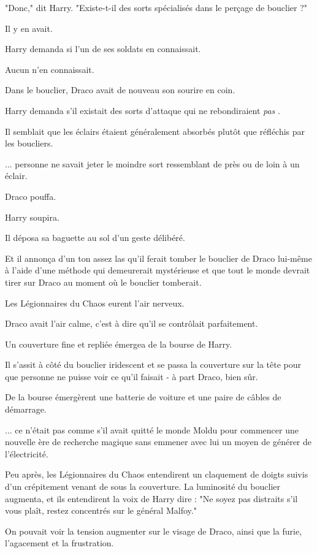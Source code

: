 "Donc," dit Harry. "Existe-t-il des sorts spécialisés dans le perçage de bouclier ?"

Il y en avait.

Harry demanda si l'un de ses soldats en connaissait.

Aucun n'en connaissait.

Dans le bouclier, Draco avait de nouveau son sourire en coin.

Harry demanda s'il existait des sorts d'attaque qui ne rebondiraient \emph{pas} .

Il semblait que les éclairs étaient généralement absorbés plutôt que réfléchis par les boucliers.

... personne ne savait jeter le moindre sort ressemblant de près ou de loin à un éclair.

Draco pouffa.

Harry soupira.

Il déposa sa baguette au sol d'un geste délibéré.

Et il annonça d'un ton assez las qu'il ferait tomber le bouclier de Draco lui-même à l'aide d'une méthode qui demeurerait mystérieuse et que tout le monde devrait tirer sur Draco au moment où le bouclier tomberait.

Les Légionnaires du Chaos eurent l'air nerveux.

Draco avait l'air calme, c'est à dire qu'il se contrôlait parfaitement.

Un couverture fine et repliée émergea de la bourse de Harry.

Il s'assit à côté du bouclier iridescent et se passa la couverture sur la tête pour que personne ne puisse voir ce qu'il faisait - à part Draco, bien sûr.

De la bourse émergèrent une batterie de voiture et une paire de câbles de démarrage.

... ce n'était pas comme s'il avait quitté le monde Moldu pour commencer une nouvelle ère de recherche magique sans emmener avec lui un moyen de générer de l'électricité.

Peu après, les Légionnaires du Chaos entendirent un claquement de doigts suivis d'un crépitement venant de sous la couverture. La luminosité du bouclier augmenta, et ils entendirent la voix de Harry dire : "Ne soyez pas distraits s'il vous plaît, restez concentrés sur le général Malfoy."

On pouvait voir la tension augmenter sur le visage de Draco, ainsi que la furie, l'agacement et la frustration.

